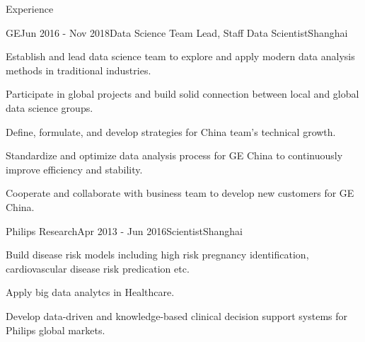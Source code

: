 \documentclass{resume} %
\begin{document}
\begin{rSection}{Experience}

\begin{rSubsection}{GE}{Jun 2016 - Nov 2018}{Data Science Team Lead, Staff Data Scientist}{Shanghai}
\item Establish and lead data science team to explore and apply modern data analysis methods in traditional industries.
\item Participate in global projects and build solid connection between local and global data science groups.
\item Define, formulate, and develop strategies for China team's technical growth.
\item Standardize and optimize data analysis process for GE China to continuously improve efficiency and stability.
\item Cooperate and collaborate with business team to develop new customers for GE China.
\end{rSubsection}


\begin{rSubsection}{Philips Research}{Apr 2013 - Jun 2016}{Scientist}{Shanghai}
\item Build disease risk models including high risk pregnancy identification, cardiovascular disease risk predication etc.
\item Apply big data analytcs in Healthcare.
\item Develop data-driven and knowledge-based clinical decision support systems for Philips global markets.
\end{rSubsection}


\end{rSection}

\end{document}
